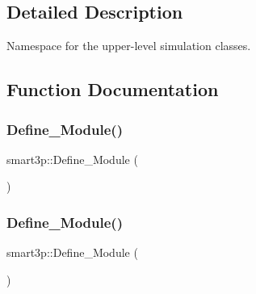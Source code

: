 \subsection{Detailed Description}
Namespace for the upper-\/level simulation classes. 

\subsection{Function Documentation}
\mbox{\label{namespacesmart3p_a0067060cf5f5fb419510d9902e680ae5}} 
\subsubsection{\texorpdfstring{Define\+\_\+\+Module()}{Define\_Module()}\hspace{0.1cm}{\footnotesize\ttfamily [1/5]}}
{\footnotesize\ttfamily smart3p\+::\+Define\+\_\+\+Module (\begin{DoxyParamCaption}\item[{\hyperlink{classsmart3p_1_1Collector}{Collector}}]{ }\end{DoxyParamCaption})}

\mbox{\label{namespacesmart3p_aa934e0c414152b03a9d6a2a3e6dc60eb}} 
\subsubsection{\texorpdfstring{Define\+\_\+\+Module()}{Define\_Module()}\hspace{0.1cm}{\footnotesize\ttfamily [2/5]}}
{\footnotesize\ttfamily smart3p\+::\+Define\+\_\+\+Module (\begin{DoxyParamCaption}\item[{\hyperlink{classsmart3p_1_1UtilityCompany}{Utility\+Company}}]{ }\end{DoxyParamCaption})}

\mbox{\label{namespacesmart3p_ae0f35b9f51bb320b6dc0f724b41889c0}} 
